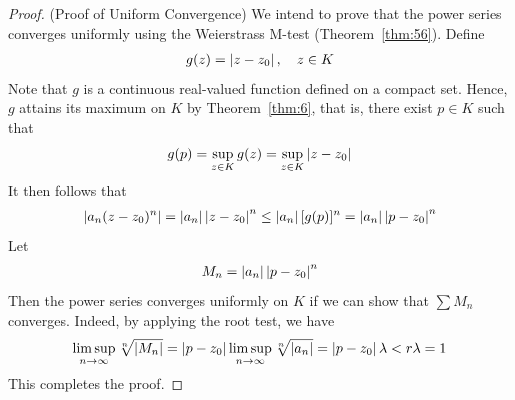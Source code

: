 \documentclass[thmcnt=section, 12pt]{my-elegantbook}
\begin{document}
\begin{proof}
    (Proof of Uniform Convergence) We intend to prove that the power series converges uniformly using the Weierstrass M-test (Theorem~\ref{thm:56}). Define
    \begin{align*}
        g(z) = \left\lvert z - z_0 \right\rvert,
        \quad z \in K
    \end{align*}
    Note that $g$ is a continuous real-valued function defined on a compact set. Hence, $g$ attains its maximum on $K$ by Theorem~\ref{thm:6}, that is, there exist $p \in K$ such that 
    \begin{align*}
        g(p) = \sup_{z \in K} g(z)
        = \sup_{z \in K} \left\lvert z - z_0 \right\rvert
    \end{align*}
    It then follows that 
    \begin{align*}
        \left\lvert a_n (z - z_0)^n \right\rvert
        = \left\lvert a_n \right\rvert \left\lvert z - z_0 \right\rvert^n
        \leq \left\lvert a_n \right\rvert [g(p)]^n
        = \left\lvert a_n \right\rvert \left\lvert p - z_0 \right\rvert^n
    \end{align*}
    Let 
    \begin{align*}
        M_n = \left\lvert a_n \right\rvert \left\lvert p - z_0 \right\rvert^n
    \end{align*}
    Then the power series converges uniformly on $K$ if we can show that $\sum M_n$ converges. Indeed, by applying the root test, we have 
    \begin{align*}
        \limsup_{n \to \infty} \sqrt[n]{\left\lvert M_n \right\rvert}
        = \left\lvert p - z_0 \right\rvert \limsup_{n \to \infty} \sqrt[n]{\left\lvert a_n \right\rvert}
        = \left\lvert p - z_0 \right\rvert \lambda
        < r \lambda
        = 1
    \end{align*}
    This completes the proof.
\end{proof}



\printindex

\end{document}
